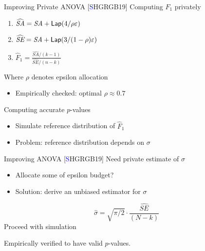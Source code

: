 \documentclass{beamer}
\newcommand{\se}{\textit{SE}\xspace}
\newcommand{\sa}{\textit{SA}\xspace}
\newcommand{\lap}{\ensuremath{{\sf Lap}}\xspace}
\begin{document}
\begin{frame}{Improving Private ANOVA [\textcolor{blue}{S}HGRGB19]}
Computing $F_1$ privately \pause
\begin{enumerate}
	\item $\widehat{\sa}  = \sa + \lap(4/\rho\varepsilon)$
    \item $\widehat{\se} = \sa + \lap(3/(1-\rho)\varepsilon)$ \pause
    \item $\widehat{F}_1 = \frac{\widehat{\sa}/(k-1)}{\widehat{\se}/(n-k)}$ \pause
\end{enumerate}
Where $\rho$ denotes epsilon allocation
\begin{itemize}
	\item Empirically checked: optimal $\rho \approx 0.7$ \pause
\end{itemize}
Computing accurate $p$-values \pause
\begin{itemize}
	\item Simulate reference distribution of $\widehat{F}_1$ \pause
	\item Problem: reference distribution depends on $\sigma$
\end{itemize}
\end{frame}


\begin{frame}{Improving ANOVA [\textcolor{blue}{S}HGRGB19]}
Need private estimate of $\sigma$ \pause
\begin{itemize}
	\item Allocate some of epsilon budget? \pause
	\item Solution: derive an unbiased estimator for $\sigma$ \pause
\end{itemize}
\bigskip

$$\hat{\sigma} = \sqrt{\pi/2} \cdot \frac{\widehat{SE}}{(N-k)} $$ \pause
\bigskip
Proceed with simulation
\bigskip

Empirically verified to have valid $p$-values.
\end{frame}
\end{document}
